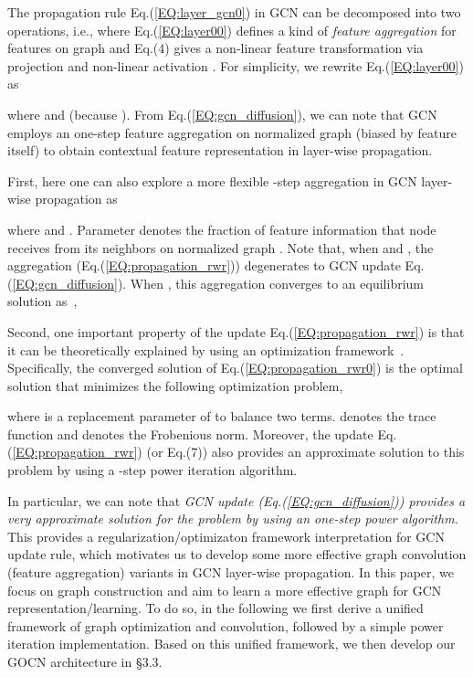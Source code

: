 \documentclass{article}
\begin{document}
The propagation rule Eq.(\ref{EQ:layer_gcn0}) in GCN can be decomposed into two operations, i.e.,  
where Eq.(\ref{EQ:layer00}) defines a kind of \emph{feature aggregation} for features  on graph and Eq.(4) gives a non-linear feature transformation via projection  and non-linear activation  .
For simplicity, we rewrite Eq.(\ref{EQ:layer00}) as

where  and  (because ).
From Eq.(\ref{EQ:gcn_diffusion}), we can note that GCN employs an one-step feature aggregation on normalized graph  (biased by feature itself) to obtain contextual feature representation in layer-wise propagation.

First, here one can also explore a more flexible -step aggregation in GCN layer-wise propagation as

where   and . Parameter  denotes the fraction of feature information that node  receives from its neighbors on normalized graph .
Note that, when  and , the aggregation (Eq.(\ref{EQ:propagation_rwr})) degenerates to GCN update Eq.(\ref{EQ:gcn_diffusion}).
When , this aggregation converges to an equilibrium solution  as~\cite{LCL,LCL2},


Second, one important property of the update Eq.(\ref{EQ:propagation_rwr}) is that it can be theoretically explained by using an optimization framework~\cite{LCL}. Specifically, the converged solution of Eq.(\ref{EQ:propagation_rwr0}) is the optimal solution
that minimizes the following optimization problem,

where  is a replacement parameter of  to balance two terms.  denotes the trace function and  denotes the Frobenious norm.
Moreover, the update Eq.(\ref{EQ:propagation_rwr}) (or Eq.(7)) also provides an approximate solution to this problem by using a -step power iteration algorithm.

In particular, we can note that \emph{GCN update (Eq.(\ref{EQ:gcn_diffusion})) provides a very approximate solution for the problem  by using an one-step power algorithm.}
 This provides a regularization/optimizaton framework interpretation for GCN update rule, which motivates us to develop  some more effective graph convolution (feature aggregation) variants in GCN layer-wise propagation. In this paper, we focus on  graph construction  and aim to learn a more effective graph for GCN representation/learning.
 To do so, in the following we first derive a  unified framework of graph optimization and convolution, followed by a simple power iteration implementation. Based on this unified framework, we then develop our GOCN architecture in \S 3.3.
\end{document}
